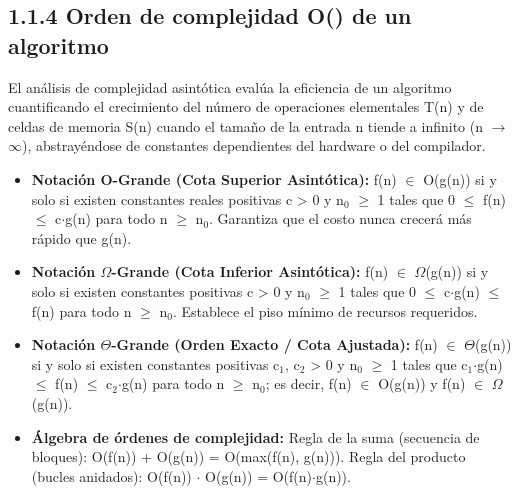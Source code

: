 \documentclass[11pt,letterpaper]{article}
\begin{document}
\subsection*{1.1.4 Orden de complejidad O() de un algoritmo}
El análisis de complejidad asintótica evalúa la eficiencia de un algoritmo cuantificando el crecimiento del número de operaciones elementales T(n) y de celdas de memoria S(n) cuando el tamaño de la entrada n tiende a infinito (n $\rightarrow$ $\infty$), abstrayéndose de constantes dependientes del hardware o del compilador.\par
\begin{itemize}
\setlength{\itemsep}{2pt}\setlength{\parskip}{0pt}
  \item \textbf{Notación O-Grande (Cota Superior Asintótica): }f(n) $\in$ O(g(n)) si y solo si existen constantes reales positivas c > 0 y n$_0$ $\ge$ 1 tales que 0 $\le$ f(n) $\le$ c$\cdot$g(n) para todo n $\ge$ n$_0$. Garantiza que el costo nunca crecerá más rápido que g(n).
  \item \textbf{Notación $\Omega$-Grande (Cota Inferior Asintótica): }f(n) $\in$ $\Omega$(g(n)) si y solo si existen constantes positivas c > 0 y n$_0$ $\ge$ 1 tales que 0 $\le$ c$\cdot$g(n) $\le$ f(n) para todo n $\ge$ n$_0$. Establece el piso mínimo de recursos requeridos.
  \item \textbf{Notación $\Theta$-Grande (Orden Exacto / Cota Ajustada): }f(n) $\in$ $\Theta$(g(n)) si y solo si existen constantes positivas c$_1$, c$_2$ > 0 y n$_0$ $\ge$ 1 tales que c$_1$$\cdot$g(n) $\le$ f(n) $\le$ c$_2$$\cdot$g(n) para todo n $\ge$ n$_0$; es decir, f(n) $\in$ O(g(n)) y f(n) $\in$ $\Omega$(g(n)).
  \item \textbf{Álgebra de órdenes de complejidad: }Regla de la suma (secuencia de bloques): O(f(n)) + O(g(n)) = O(max(f(n), g(n))). Regla del producto (bucles anidados): O(f(n)) $\cdot$ O(g(n)) = O(f(n)$\cdot$g(n)).
\end{itemize}
\vspace{4pt}\noindent
\end{document}
